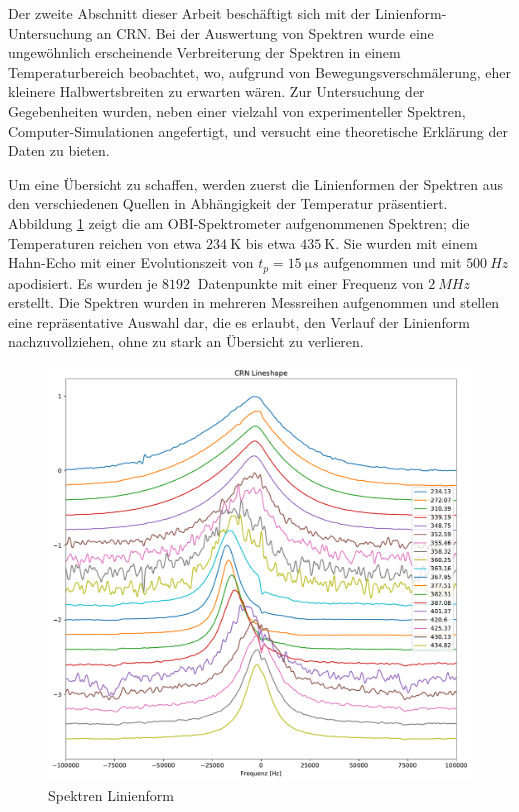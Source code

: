 Der zweite Abschnitt dieser Arbeit beschäftigt sich mit der Linienform-Untersuchung an CRN. Bei der Auswertung von Spektren wurde eine ungewöhnlich erscheinende Verbreiterung der Spektren in einem Temperaturbereich beobachtet, wo, aufgrund von Bewegungsverschmälerung, eher kleinere Halbwertsbreiten zu erwarten wären. Zur Untersuchung der Gegebenheiten wurden, neben einer vielzahl von experimenteller Spektren, Computer-Simulationen angefertigt, und versucht eine theoretische Erklärung der Daten zu bieten.

Um eine Übersicht zu schaffen, werden zuerst die Linienformen der Spektren aus den verschiedenen Quellen in Abhängigkeit der Temperatur präsentiert. Abbildung \ref{fig:res:spek_linienform} zeigt die am OBI-Spektrometer aufgenommenen Spektren; die Temperaturen reichen von etwa $\SI{234}{\kelvin}$ bis etwa $\SI{435}{\kelvin}$. Sie wurden mit einem Hahn-Echo mit einer Evolutionszeit von $t_p = \SI{15}{\micro s}$ aufgenommen und mit $\SI{500}{Hz}$ apodisiert. Es wurden je $\SI{8192}{}$ Datenpunkte mit einer Frequenz von $\SI{2}{MHz}$ erstellt. Die Spektren wurden in mehreren Messreihen aufgenommen und stellen eine repräsentative Auswahl dar, die es erlaubt, den Verlauf der Linienform nachzuvollziehen, ohne zu stark an Übersicht zu verlieren.
\begin{figure}
	\begin{center}
		\includegraphics[width=\textwidth]{graphics/plots/SPEK/spek_lineshape.pdf}
	\end{center}
	\caption{Spektren Linienform} \label{fig:res:spek_linienform}
\end{figure}
